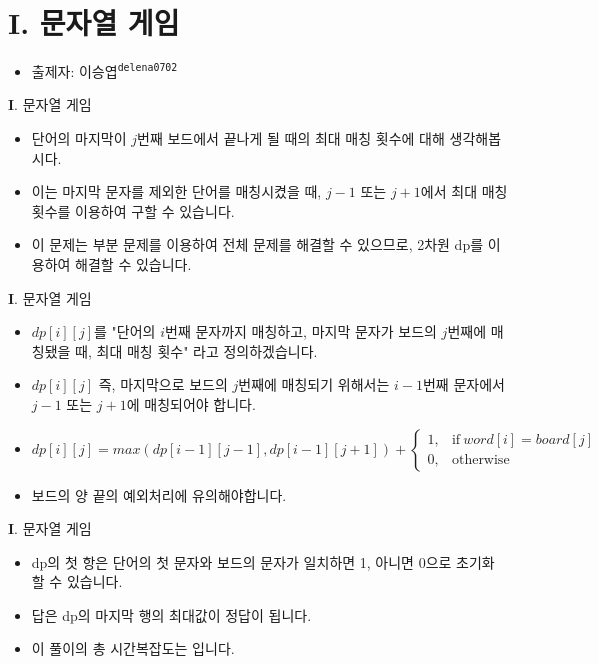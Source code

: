 \section{I. 문자열 게임}

\begin{frame} %
    \begin{itemize}
        \item 출제자: 이승엽\textsuperscript{\color{kupc-gray}\texttt{delena0702}}
    \end{itemize}
\end{frame}

\begin{frame}{\textbf{I}. 문자열 게임}
\begin{itemize}
	\item 단어의 마지막이 $j$번째 보드에서 끝나게 될 때의 최대 매칭 횟수에 대해 생각해봅시다.
	\item 이는 마지막 문자를 제외한 단어를 매칭시켰을 때, $j - 1$ 또는 $j + 1$에서 최대 매칭 횟수를 이용하여 구할 수 있습니다.
	\item 이 문제는 부분 문제를 이용하여 전체 문제를 해결할 수 있으므로, 2차원 dp를 이용하여 해결할 수 있습니다.
\end{itemize}
\end{frame}

\begin{frame}{\textbf{I}. 문자열 게임}
	\begin{itemize}
		\item $dp[i][j]$를 "단어의 $i$번째 문자까지 매칭하고, 마지막 문자가 보드의 $j$번째에 매칭됐을 때, 최대 매칭 횟수" 라고 정의하겠습니다.
		\item $dp[i][j]$ 즉, 마지막으로 보드의 $j$번째에 매칭되기 위해서는 $i - 1$번째 문자에서 $j - 1$ 또는 $j + 1$에 매칭되어야 합니다.
		\item $dp[i][j] = max(dp[i - 1][j - 1], dp[i - 1][j + 1]) + \begin{cases}
			1, & \text{if}\ word[i] = board[j] \\
			0, & \text{otherwise}
		\end{cases} $
		\item 보드의 양 끝의 예외처리에 유의해야합니다.
	\end{itemize}
\end{frame}

\begin{frame}{\textbf{I}. 문자열 게임}
	\begin{itemize}
		\item dp의 첫 항은 단어의 첫 문자와 보드의 문자가 일치하면 1, 아니면 0으로 초기화 할 수 있습니다.
		\item 답은 dp의 마지막 행의 최대값이 정답이 됩니다.
		\item 이 풀이의 총 시간복잡도는 입니다.
	\end{itemize}
\end{frame}